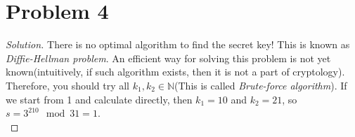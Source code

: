 \section*{Problem 4}
	\begin{proof} [Solution]
		There is no optimal algorithm to find the secret key! This is known as \textit{Diffie-Hellman problem}. An efficient way for solving this problem is not yet known(intuitively, if such algorithm exists, then it is not a part of cryptology). Therefore, you should try all $k_1, k_2 \in \mathbb{N}$(This is called \textit{Brute-force algorithm}). If we start from 1 and calculate directly, then $k_1 = 10$ and $k_2 = 21$, so $s = 3^{210}\mod 31 = 1$.\\
	\end{proof}